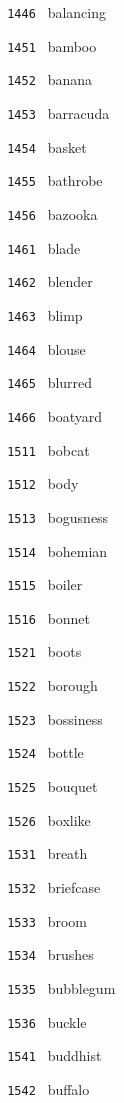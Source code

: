 \documentclass[11pt]{article}
\begin{document}
\begin{multicols}{6}
\noindent \texttt{ 1446 } balancing  \par
\noindent \texttt{ 1451 } bamboo  \par
\noindent \texttt{ 1452 } banana  \par
\noindent \texttt{ 1453 } barracuda  \par
\noindent \texttt{ 1454 } basket  \par
\noindent \texttt{ 1455 } bathrobe  \par
\noindent \texttt{ 1456 } bazooka  \par
\noindent \texttt{ 1461 } blade  \par
\noindent \texttt{ 1462 } blender  \par
\noindent \texttt{ 1463 } blimp  \par
\noindent \texttt{ 1464 } blouse  \par
\noindent \texttt{ 1465 } blurred  \par
\noindent \texttt{ 1466 } boatyard  \par
\noindent \texttt{ 1511 } bobcat  \par
\noindent \texttt{ 1512 } body  \par
\noindent \texttt{ 1513 } bogusness  \par
\noindent \texttt{ 1514 } bohemian  \par
\noindent \texttt{ 1515 } boiler  \par
\noindent \texttt{ 1516 } bonnet  \par
\noindent \texttt{ 1521 } boots  \par
\noindent \texttt{ 1522 } borough  \par
\noindent \texttt{ 1523 } bossiness  \par
\noindent \texttt{ 1524 } bottle  \par
\noindent \texttt{ 1525 } bouquet  \par
\noindent \texttt{ 1526 } boxlike  \par
\noindent \texttt{ 1531 } breath  \par
\noindent \texttt{ 1532 } briefcase  \par
\noindent \texttt{ 1533 } broom  \par
\noindent \texttt{ 1534 } brushes  \par
\noindent \texttt{ 1535 } bubblegum  \par
\noindent \texttt{ 1536 } buckle  \par
\noindent \texttt{ 1541 } buddhist  \par
\noindent \texttt{ 1542 } buffalo  \par

\end{multicols}
\end{document}
